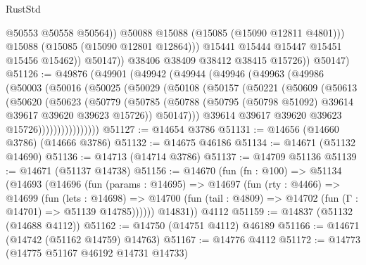 \begin{lexlean}{RustStd}
\begin{coremodule}
                          @50553
                          @50558
                          @50564))
                      @50088
                      @15088
                      (@15085 (@15090 @12811 @4801)))
                    @15088
                    (@15085 (@15090 @12801 @12864)))
                  @15441
                  @15444
                  @15447
                  @15451
                  @15456
                  @15462))
              @50147))
          @38406
          @38409
          @38412
          @38415
          @15726))
      @50147)
@51126 := @49876
    (@49901
      (@49942
        (@49944
          (@49946
            (@49963
              (@49986
                (@50003
                  (@50016
                    (@50025
                      (@50029
                        (@50108
                          (@50157
                            (@50221
                              (@50609
                                (@50613
                                  (@50620
                                    (@50623
                                      (@50779
                                        (@50785
                                          (@50788
                                            (@50795
                                              (@50798 @51092)
                                              @39614
                                              @39617
                                              @39620
                                              @39623
                                              @15726))
                                          @50147)))
                                    @39614
                                    @39617
                                    @39620
                                    @39623
                                    @15726))))))))))))))))
@51127 := @14654 @3786
@51131 := @14656 (@14660 @3786) (@14666 @3786)
@51132 := @14675 @46186
@51134 := @14671 (@51132 @14690)
@51136 := @14713 (@14714 @3786)
@51137 := @14709 @51136
@51139 := @14671 (@51137 @14738)
@51156 := @14670
    (fun (fn : @100) =>
    @51134
      (@14693
        (@14696
          (fun (params : @14695) =>
          @14697
            (fun (rty : @4466) =>
            @14699
              (fun (lets : @14698) =>
              @14700 (fun (tail : @4809) => @14702 (fun (Γ : @14701) => @51139 @14785))))))
        @14831))
    @4112
@51159 := @14837 (@51132 (@14688 @4112))
@51162 := @14750 (@14751 @4112) @46189
@51166 := @14671 (@14742 (@51162 @14759) @14763)
@51167 := @14776 @4112
@51172 := @14773 (@14775 @51167 @46192 @14731 @14733)

\end{coremodule}
\end{lexlean}
